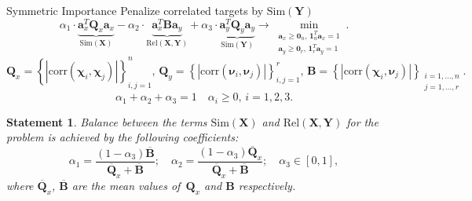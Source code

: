\documentclass[9pt]{beamer}
\newcommand{\ba}{\mathbf{a}}
\newcommand{\bY}{\mathbf{Y}}
\newcommand{\bX}{\mathbf{X}}
\newcommand{\bB}{\mathbf{B}}
\newcommand{\bQ}{\mathbf{Q}}
\newcommand{\bchi}{\boldsymbol{\chi}}
\newcommand{\bnu}{\boldsymbol{\nu}}
\newcommand{\bOne}{\boldsymbol{1}}
\newcommand{\bZero}{\boldsymbol{0}}
\newtheorem{statement}{Statement}
\begin{document}
\begin{frame}{Symmetric Importance}
Penalize correlated targets by $\text{Sim} (\bY)$
\[
\alpha_1 \cdot \underbrace{\ba_x^{T} \bQ_x \ba_x}_{\text{Sim}(\bX)} - \alpha_2 \cdot \underbrace{\ba_x^{T} \bB \ba_y}_{\text{Rel}(\bX, \bY)} + \alpha_3 \cdot \underbrace{\ba_y^{T} \bQ_y \ba_y}_{\text{Sim}(\bY)} \rightarrow \min_{\substack{\ba_x \geq \bZero_n, \, \bOne_n^T\ba_x=1 \\ \ba_y \geq \bZero_r, \, \bOne_r^T\ba_y=1}}.
\]
\[
\bQ_x = \left\{ \left| \text{corr}(\bchi_i, \bchi_j) \right| \right\}_{i,j=1}^n, \,
\bQ_y = \left\{ \left| \text{corr}(\bnu_i, \bnu_j) \right| \right\}_{i,j=1}^r, \,
\bB =  \left\{ \left| \text{corr}(\bchi_i, \bnu_j) \right| \right\}_{\substack{i=1, \dots, n \\ j=1, \dots, r}}.
\]
\[
\alpha_1 + \alpha_2 + \alpha_3 = 1 \quad \alpha_i \geq 0, \, i = 1, 2, 3.
\] 

\begin{statement}
	Balance between the terms $\text{Sim}(\bX)$ and $\text{Rel}(\bX, \bY)$ for the problem is achieved by the following coefficients:
	\vspace{-0.2cm}
	\[
	\alpha_1 = \frac{(1 - \alpha_3)\overline{\bB}}{\overline{\bQ}_x + \overline{\bB}}; \quad
	\alpha_2 = \frac{(1 - \alpha_3)\overline{\bQ}_x}{\overline{\bQ}_x + \overline{\bB}}; \quad
	\alpha_3 \in [0, 1],
	\]
	where $\overline{\bQ}_x$, $\overline{\bB}$ are the mean values of~$\bQ_x$ and $\bB$ respectively.
\end{statement}
\end{frame}
\end{document}
